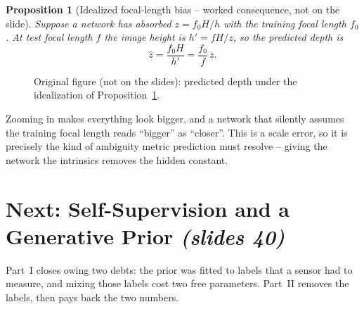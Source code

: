 \documentclass[11pt,a4paper]{article}
\numberwithin{equation}{section}
\newcommand{\slides}[1]{\texorpdfstring{\;\emph{(slides #1)}}{ (slides #1)}}
\theoremstyle{plain}
\newtheorem{proposition}[theorem]{Proposition}
\theoremstyle{definition}
\begin{document}
\begin{proposition}[Idealized focal-length bias -- worked consequence, not on the slide]\label{prop:focal}
Suppose a network has absorbed $z=f_0H/h$ with the training focal length $f_0$. At test focal length $f$ the image height is $h'=fH/z$, so the predicted depth is
\[
\hat z=\frac{f_0H}{h'}=\frac{f_0}{f}\,z .
\]
\end{proposition}
 
\begin{figure}[htbp]
\centering
{}
\caption{Original figure (not on the slides): predicted depth under the idealization of Proposition~\ref{prop:focal}.}
\end{figure}
 
\begin{intuition}
Zooming in makes everything look bigger, and a network that silently assumes the training focal length reads ``bigger'' as ``closer''. This is a scale error, so it is precisely the kind of ambiguity metric prediction must resolve -- giving the network the intrinsics removes the hidden constant.
\end{intuition}

\section*{Next: Self-Supervision and a Generative Prior \slides{40}}

Part~I closes owing two debts: the prior was fitted to labels that a sensor had to measure, and mixing those labels cost two free parameters. Part~II removes the labels, then pays back the two numbers.
\end{document}
